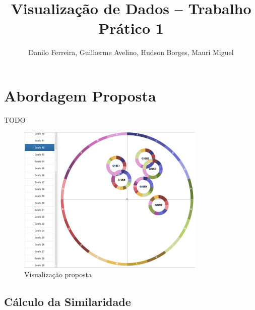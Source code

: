 \documentclass[12pt]{article}
\title{Visualização de Dados -- Trabalho Prático 1}
\author{Danilo Ferreira, Guilherme Avelino, Hudson Borges, Mauri Miguel}
\begin{document}
\maketitle





\section{Abordagem Proposta}

TODO


\begin{figure}[h!]
  \caption{Visualização proposta}
  \centering
  \includegraphics[width=0.8\textwidth]{visualizacao.png}
\end{figure}


\subsection{Cálculo da Similaridade}
\end{document}
